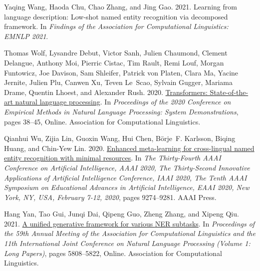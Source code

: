 \documentclass[11pt]{article}
\begin{document}
\begin{thebibliography}{45}
Yaqing Wang, Haoda Chu, Chao Zhang, and Jing Gao. 2021{}.
\newblock Learning from language description: Low-shot named entity recognition
  via decomposed framework.
\newblock In \emph{Findings of the Association for Computational Linguistics:
  EMNLP 2021}.

Thomas Wolf, Lysandre Debut, Victor Sanh, Julien Chaumond, Clement Delangue,
  Anthony Moi, Pierric Cistac, Tim Rault, Remi Louf, Morgan Funtowicz, Joe
  Davison, Sam Shleifer, Patrick von Platen, Clara Ma, Yacine Jernite, Julien
  Plu, Canwen Xu, Teven Le~Scao, Sylvain Gugger, Mariama Drame, Quentin Lhoest,
  and Alexander Rush. 2020.
\newblock \href {https://doi.org/10.18653/v1/2020.emnlp-demos.6} {Transformers:
  State-of-the-art natural language processing}.
\newblock In \emph{Proceedings of the 2020 Conference on Empirical Methods in
  Natural Language Processing: System Demonstrations}, pages 38--45, Online.
  Association for Computational Linguistics.

Qianhui Wu, Zijia Lin, Guoxin Wang, Hui Chen, B{\"{o}}rje~F. Karlsson, Biqing
  Huang, and Chin{-}Yew Lin. 2020.
\newblock \href {https://aaai.org/ojs/index.php/AAAI/article/view/6466}
  {Enhanced meta-learning for cross-lingual named entity recognition with
  minimal resources}.
\newblock In \emph{The Thirty-Fourth {AAAI} Conference on Artificial
  Intelligence, {AAAI} 2020, The Thirty-Second Innovative Applications of
  Artificial Intelligence Conference, {IAAI} 2020, The Tenth {AAAI} Symposium
  on Educational Advances in Artificial Intelligence, {EAAI} 2020, New York,
  NY, USA, February 7-12, 2020}, pages 9274--9281. {AAAI} Press.

Hang Yan, Tao Gui, Junqi Dai, Qipeng Guo, Zheng Zhang, and Xipeng Qiu. 2021.
\newblock \href {https://doi.org/10.18653/v1/2021.acl-long.451} {A unified
  generative framework for various {NER} subtasks}.
\newblock In \emph{Proceedings of the 59th Annual Meeting of the Association
  for Computational Linguistics and the 11th International Joint Conference on
  Natural Language Processing (Volume 1: Long Papers)}, pages 5808--5822,
  Online. Association for Computational Linguistics.


\end{thebibliography}
\end{document}
